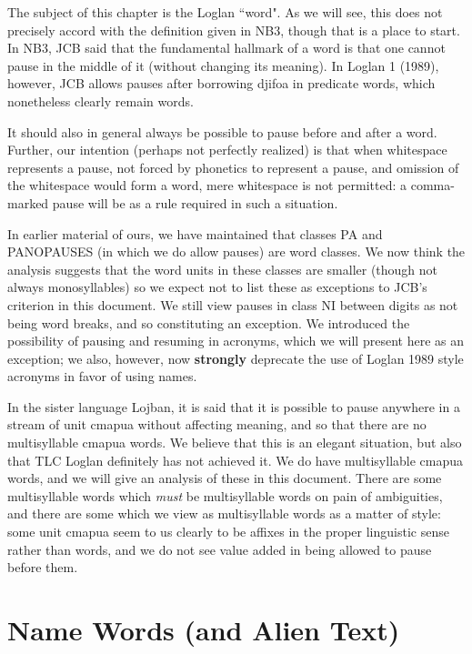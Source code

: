 \documentclass[12pt]{book}
\begin{document}
The subject of this chapter is the Loglan ``word".  As we will see, this does not precisely accord with the definition given in NB3, though that is a place to start.  In NB3, JCB said that the fundamental hallmark of a word is that one cannot pause in the middle of it (without changing its meaning).
In Loglan 1 (1989), however, JCB allows pauses after borrowing djifoa in predicate words, which nonetheless clearly remain words.

It should also in general always be possible to pause before and after a word.  Further, our intention (perhaps not perfectly realized) is that when whitespace represents a pause, not forced by phonetics to represent a pause, and omission of the whitespace would form a word, mere whitespace is not permitted:  a comma-marked pause will be as a rule required in such a situation.

In earlier material of ours, we have maintained that classes PA and PANOPAUSES (in which we do allow pauses) are word classes.  We now think the analysis suggests that the word units
in these classes are smaller (though not always monosyllables) so we expect not to list these as exceptions to JCB's criterion in this document.  We still view pauses in class NI between digits as not being word breaks, and so constituting an exception.  We introduced the possibility of pausing
and resuming in acronyms, which we will present here as an exception;  we also, however, now {\bf strongly} deprecate the use of Loglan 1989 style acronyms in favor of using names.

In the sister language Lojban, it is said that it is possible to pause anywhere in a stream of unit cmapua without affecting meaning, and so that there are no multisyllable cmapua words.
We believe that this is an elegant situation, but also that TLC Loglan definitely has not achieved it.  We do have multisyllable cmapua words, and we will give an analysis of these in this document.
There are some multisyllable words which {\em must\/} be multisyllable words on pain of ambiguities, and there are some which we view as multisyllable words as a matter of style:  some unit cmapua seem to us clearly to be affixes in the proper linguistic sense rather than words, and we do not see value added in being allowed to pause before them.

\section{Name Words (and Alien Text)}
\end{document}

